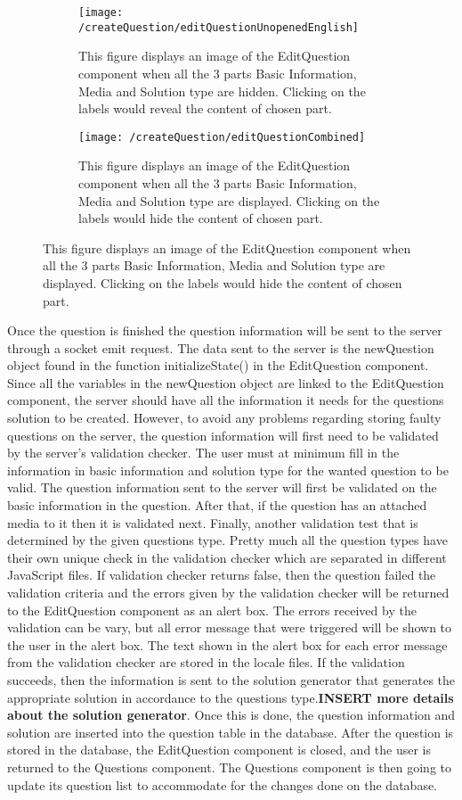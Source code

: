 \begin{figure}[H]
	\centering
	\begin{subfigure}{0.70\linewidth}
		\texttt{[image: /createQuestion/editQuestionUnopenedEnglish]}
		\caption{This figure displays an image of the EditQuestion component when all the 3 parts Basic Information, Media and Solution type are hidden. Clicking on the labels would reveal the content of chosen part.}
		\label{fig:editquestionUnopened}
	\end{subfigure}
	\begin{subfigure}{0.70\linewidth}
		\texttt{[image: /createQuestion/editQuestionCombined]}
		\caption{This figure displays an image of the EditQuestion component when all the 3 parts Basic Information, Media and Solution type are displayed. Clicking on the labels would hide the content of chosen part.}
		\label{fig:editquestionOpened}
	\end{subfigure}
\end{figure}
\noindent
Once the question is finished the question information will be sent to the server through a socket emit request. The data sent to the server is the newQuestion object found in the function initializeState() in the EditQuestion component. Since all the variables in the newQuestion object are linked to the EditQuestion component, the server should have all the information it needs for the questions solution to be created. However, to avoid any problems regarding storing faulty questions on the server, the question information will first need to be validated by the server's validation checker. The user must at minimum fill in the information in basic information and solution type for the wanted question to be valid. The question information sent to the server will first be validated on the basic information in the question. After that, if the question has an attached media to it then it is validated next. Finally, another validation test that is determined by the given questions type. Pretty much all the question types have their own unique check in the validation checker which are separated in different JavaScript files. If validation checker returns false, then the question failed the validation criteria and the errors given by the validation checker will be returned to the EditQuestion component as an alert box. The errors received by the validation can be vary, but all error message that were triggered will be shown to the user in the alert box. The text shown in the alert box for each error message from the validation checker are stored in the locale files. If the validation succeeds, then the information is sent to the solution generator that generates the appropriate solution in accordance to the questions type.\textbf{INSERT more details about the solution generator}. Once this is done, the question information and solution are inserted into the question table in the database. After the question is stored in the database, the EditQuestion component is closed, and the user is returned to the Questions component. The Questions component is then going to update its question list to accommodate for the changes done on the database.
